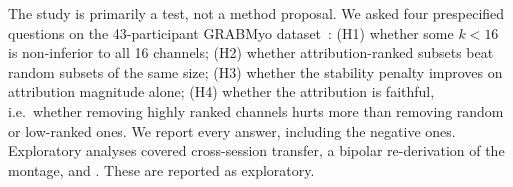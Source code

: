 The study is primarily a test, not a method proposal. We asked four prespecified questions on the 43-participant GRABMyo dataset~\cite{pradhan2022multiday}:
(H1) whether some $k < 16$ is non-inferior to all 16 channels;
(H2) whether attribution-ranked subsets beat random subsets of the same size;
(H3) whether the stability penalty improves on attribution magnitude alone;
(H4) whether the attribution is faithful, i.e.\ whether removing highly ranked channels hurts more than removing random or low-ranked ones.
We report every answer, including the negative ones. Exploratory analyses covered cross-session transfer, a bipolar re-derivation of the montage, and . These are reported as exploratory.
